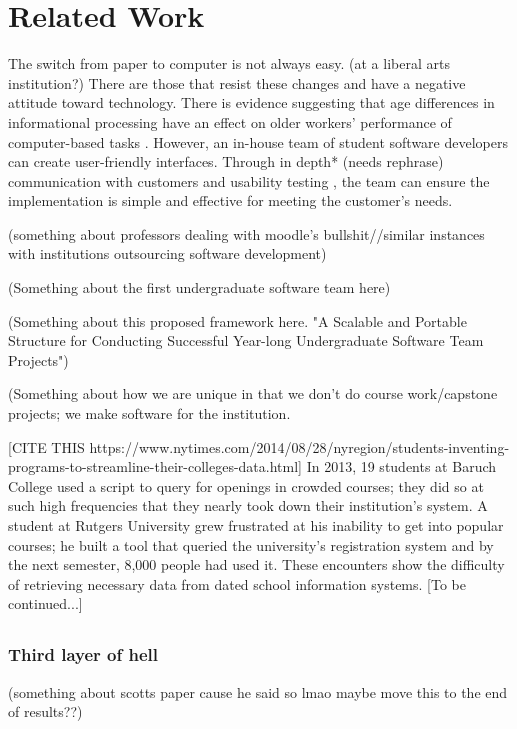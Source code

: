 \section{Related Work}

The switch from paper to computer is not always easy. (at a liberal arts institution?) There are those that resist these changes and have a negative attitude toward technology. There is evidence suggesting that age differences in informational processing have an effect on older workers' performance of computer-based tasks \cite{oldpeopleandtech}. 
However, an in-house team of student software developers can create user-friendly interfaces. Through in depth* (needs rephrase) communication with customers and usability testing \cite{usabilitytesting}, the team can ensure the implementation is simple and effective for meeting the customer's needs.

(something about professors dealing with moodle's bullshit//similar instances with institutions outsourcing software development)

(Something about the first undergraduate software team here)\cite{rochesterfirstundergradsoftwareteam}

(Something about this proposed framework here. "A Scalable and Portable Structure for Conducting Successful Year-long Undergraduate Software Team Projects") \cite{yearlong}

(Something about how we are unique in that we don't do course work/capstone projects; we make software for the institution.

[CITE THIS https://www.nytimes.com/2014/08/28/nyregion/students-inventing-programs-to-streamline-their-colleges-data.html] 
In 2013, 19 students at Baruch College used a script to query for openings in crowded courses; they did so at such high frequencies that they nearly took down their institution's system. A student at Rutgers University grew frustrated at his inability to get into popular courses; he built a tool that queried the university's registration system and by the next semester, 8,000 people had used it. These encounters show the difficulty of retrieving necessary data from dated school information systems. 
[To be continued...]
\subsection{}

\subsubsection{Third layer of hell}

(something about scotts paper cause he said so lmao maybe move this to the end of results??) \cite{heggen2018hiring}